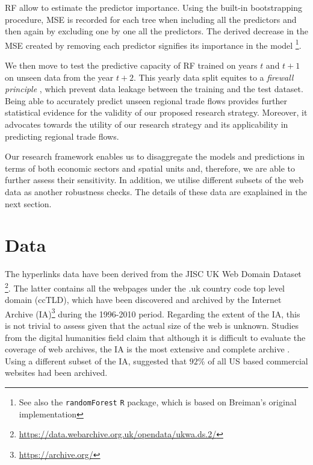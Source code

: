 \documentclass[]{interact}
\theoremstyle{plain}%
\theoremstyle{definition}
\theoremstyle{remark}
\begin{document}
RF allow to estimate the predictor importance. Using the built-in
bootstrapping procedure, MSE is recorded for each tree when including
all the predictors and then again by excluding one by one all the
predictors. The derived decrease in the MSE created by removing each
predictor signifies its importance in the model
\citep{breiman2001random}\footnote{See also the \texttt{randomForest}
  \texttt{R} package, which is based on Breiman's
  \citeyearpar{breiman2001random} original implementation}.

We then move to test the predictive capacity of RF trained on years
\(t\) and \(t + 1\) on unseen data from the year \(t + 2\). This yearly
data split equites to a \emph{firewall principle}
\citep{mullainathan2017machine}, which prevent data leakage between the
training and the test dataset. Being able to accurately predict unseen
regional trade flows provides further statistical evidence for the
validity of our proposed research strategy. Moreover, it advocates
towards the utility of our research strategy and its applicability in
predicting regional trade flows.

Our research framework enables us to disaggregate the models and
predictions in terms of both economic sectors and spatial units and,
therefore, we are able to further assess their sensitivity. In addition,
we utilise different subsets of the web data as another robustness
checks. The details of these data are exaplained in the next section.

\hypertarget{sec:4}{%
\section{Data}\label{sec:4}}

The hyperlinks data have been derived from the JISC UK Web Domain
Dataset \citep{ukwebarchive}\footnote{\url{https://data.webarchive.org.uk/opendata/ukwa.ds.2/}}.
The latter contains all the webpages under the .uk country code top
level domain (ccTLD), which have been discovered and archived by the
Internet Archive (IA)\footnote{\url{https://archive.org/}} during the
1996-2010 period. Regarding the extent of the IA, this is not trivial to
assess given that the actual size of the web is unknown. Studies from
the digital humanities field claim that although it is difficult to
evaluate the coverage of web archives, the IA is the most extensive and
complete archive \citep{Ainsworth2011, Holzmann2016}. Using a different
subset of the IA, \citet{thelwall2004fair} suggested that \(92\)\% of
all US based commercial websites had been archived.
\end{document}
